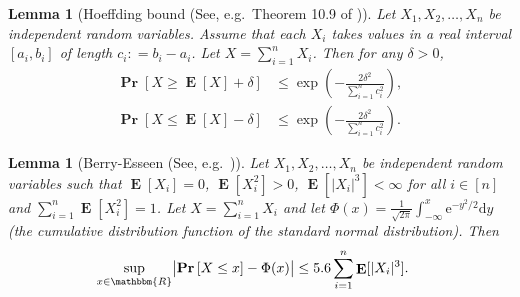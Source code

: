 \documentclass[letterpaper,11pt]{article}
\newtheorem{lemma}[theorem]{Lemma}
\renewcommand\Pr{\mathop{\mathbf{Pr}}}
\DeclareMathOperator{\E}{\mathbf{E}}
\def\defeq{\mathrel{\mathop:}=}%
\begin{document}
\begin{lemma}[Hoeffding bound (See, e.g.~Theorem 10.9 of \cite{Doerr18})]
\label{lem:Hoeffding}
Let $X_1, X_2, \ldots, X_n$ be independent random variables.
Assume that each $X_i$ takes values in a real interval $[a_i, b_i]$ of length $c_i\defeq b_i-a_i$.
Let $X=\sum_{i=1}^nX_i$.  
Then for any $\delta>0$,
\begin{align*}
\Pr\left[X\geq \E[X]+\delta \right]&\leq \exp\left(-\frac{2\delta^2 }{\sum_{i=1}^nc_i^2}\right), \\
\Pr\left[X\leq \E[X]-\delta \right]&\leq \exp\left(-\frac{2\delta^2 }{\sum_{i=1}^nc_i^2}\right).
\end{align*}
\end{lemma}


%
%
%
\begin{lemma}[Berry-Esseen (See, e.g.~\cite{Shevtsova10})]
\label{lem:Berry-Esseen}
Let $X_1, X_2, \ldots, X_n$ be independent random variables such that
$\E[X_i]=0$, $\E[X_i^2]>0$, $\E[|X_i|^3]<\infty$ for all $i\in [n]$ and $\sum_{i=1}^n\E[X_i^2]=1$.
Let $X=\sum_{i=1}^nX_i$ and 
let $\Phi(x)=\frac{1}{\sqrt{2\pi}}\int_{-\infty}^x\mathrm{e}^{-y^2/2}\mathrm{d}y$ (the cumulative distribution function of the standard normal distribution).
Then
\begin{align*}
\sup_{x\in \mathbbm{R}}\bigl|\Pr\left[X\leq x\right]-\Phi(x)\bigr|
&\leq 5.6 \sum_{i=1}^n\E[|X_i|^3].
\end{align*}
\end{lemma}
\end{document}
